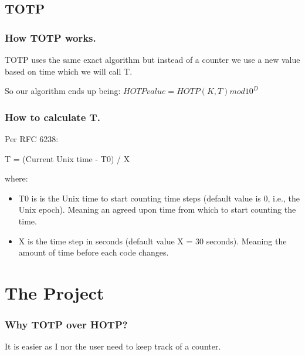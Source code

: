 \documentclass{beamer}
\begin{document}
\subsection{TOTP}
\begin{frame}

    \frametitle{How TOTP works.}
    TOTP uses the same exact algorithm but instead of a counter we use a new value based on time which we will call T. 

    So our algorithm ends up being:
    $HOTP  value = HOTP(K, T) mod 10^D$ \\

\end{frame}

\begin{frame}

    \frametitle{How to calculate T.}
    Per RFC 6238:

    T = (Current Unix time - T0) / X

    where:

    \begin{itemize}
        \item 
            T0 is is the Unix time to start counting time steps (default value is 0, i.e., the Unix epoch). Meaning an agreed upon time from which to start counting the time.
        \item 
            X is the time step in seconds (default value X = 30 seconds). Meaning the amount of time before each code changes.
    \end{itemize}

\end{frame}

\section{The Project}
\begin{frame}

    \frametitle{Why TOTP over HOTP?}
    It is easier as I nor the user need to keep track of a counter.

\end{frame}
\end{document}
